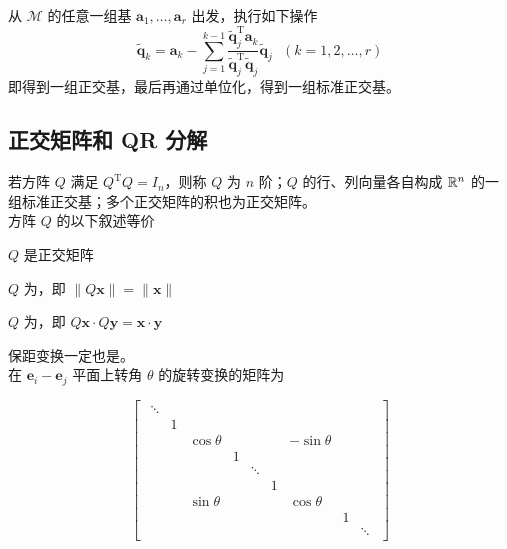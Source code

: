 \documentclass[./main.tex]{subfiles}
\begin{document}
从 $\mathcal{M}$ 的任意一组基 $\bm{a}_1,\dots,\bm{a}_r$ 出发，执行如下操作
\begin{equation}
    \bm{\widetilde{q}}_k=\bm{a}_k-\sum_{j=1}^{k-1}\frac{\bm{\widetilde{q}}_j^{\mathrm{T}}\bm{a}_k}{\bm{\widetilde{q}}_j^{\mathrm{T}}\bm{\widetilde{q}}_j}\bm{\widetilde{q}}_j \ \ \ (k=1,2,\dots,r)
\end{equation}
即得到一组正交基，最后再通过单位化，得到一组标准正交基。

\subsection{正交矩阵和 QR 分解}

若方阵 $Q$ 满足 $Q^{\mathrm{T}}Q=I_n$，则称 $Q$ 为 $n$ 阶；$Q$ 的行、列向量各自构成 $\mathbb{R}^{n}$ 的一组标准正交基；多个正交矩阵的积也为正交矩阵。\\

方阵 $Q$ 的以下叙述等价
\begin{enumerate*}
    \item $Q$ 是正交矩阵
    \item $Q$ 为，即 $\|Q\bm{x}\|=\|\bm{x}\|$
    \item $Q$ 为，即 $Q\bm{x}\cdot Q\bm{y}=\bm{x}\cdot\bm{y}$
\end{enumerate*}
保距变换一定也是。\\

在 $\bm{e}_i-\bm{e}_j$ 平面上转角 $\theta$ 的旋转变换的矩阵为

\begin{equation}
    \begin{bmatrix}
        \begin{smallmatrix}
            \ddots &&&&&&&&\\
            &1&&&&&&&\\
            &&\cos\theta&&&&-\sin\theta&&\\
            &&&1&&&&&\\
            &&&&\ddots &&&&\\
            &&&&&1&&&\\
            &&\sin\theta&&&&\cos\theta&&\\
            &&&&&&&1&\\
            &&&&&&&&\ddots
        \end{smallmatrix}
    \end{bmatrix}
\end{equation}
\end{document}

